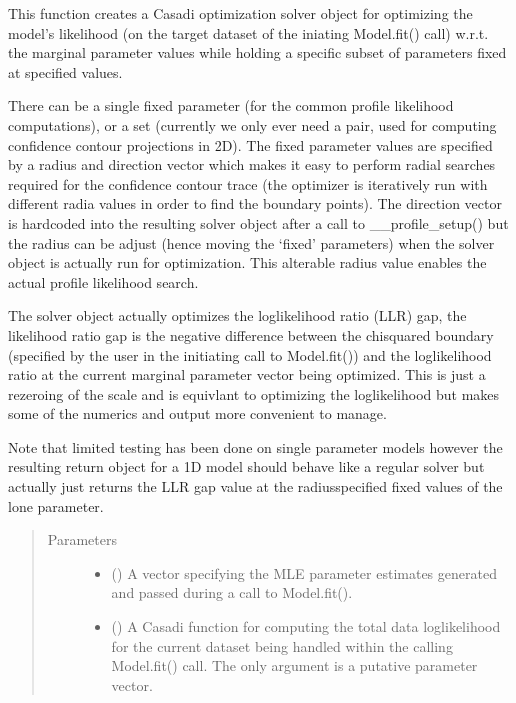 \documentclass[letterpaper,10pt,english,openany,oneside]{sphinxmanual}
\begin{document}
\begin{fulllineitems}
\begin{fulllineitems}
This function creates a Casadi optimization solver object for optimizing the model’s
likelihood (on the target dataset of the iniating Model.fit() call) w.r.t. the marginal
parameter values while holding a specific subset of parameters fixed at specified values.

There can be a single fixed parameter (for the common profile likelihood computations), or a set
(currently we only ever need a pair, used for computing confidence contour projections in 2D).
The fixed parameter values are specified by a radius and direction vector which makes it
easy to perform radial searches required for the confidence contour trace (the optimizer is
iteratively run with different radia values in order to find the boundary points). The
direction vector is hard\sphinxhyphen{}coded into the resulting solver object after a call to
\_\_profile\_setup() but the radius can be adjust (hence moving the ‘fixed’ parameters) when
the solver object is actually run for optimization. This alterable radius value
enables the actual profile likelihood search.

The solver object actually optimizes the loglikelihood ratio (LLR) gap, the likelihood ratio
gap is the negative difference between the chi\sphinxhyphen{}squared boundary (specified by the user in
the initiating call to Model.fit()) and the loglikelihood ratio at the current marginal
parameter vector being optimized. This is just a rezeroing of the scale and is equivlant to
optimizing the loglikelihood but makes some of the numerics and output more convenient to
manage.

Note that limited testing has been done on single parameter models however the resulting
return object for a 1D model should behave like a regular solver but actually just returns
the LLR gap value at the radius\sphinxhyphen{}specified fixed values of the lone parameter.
\begin{quote}\begin{description}
\item[{Parameters}] \leavevmode\begin{itemize}
\item {} 
 (\sphinxstyleliteralemphasis{\sphinxupquote{, }}) \textendash{} A vector specifying the MLE parameter estimates generated and
passed during a call to Model.fit().

\item {} 
 () \textendash{} A Casadi function for computing the total data log\sphinxhyphen{}likelihood
for the current dataset being handled within the calling Model.fit() call. The only
argument is a putative parameter vector.


\end{itemize}
\end{description}
\end{quote}
\end{fulllineitems}
\end{fulllineitems}
\end{document}
